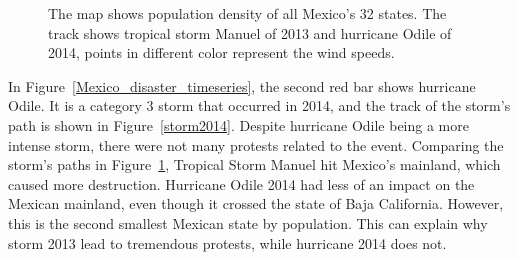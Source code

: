 \documentclass[9pt,twocolumn,twoside]{pnas-new}
\begin{document}
\begin{figure}[ht]
	\centering
	\caption{The map shows population density of all Mexico's 32 states. The track shows tropical storm Manuel of 2013 and hurricane Odile of 2014, points in different color represent the wind speeds. }
\label{Mexico-track-map}
\end{figure}



%

In Figure~\ref{Mexico_disaster_timeseries}, the second red bar shows hurricane Odile.
It is a category 3 storm that occurred in 2014, and the track of the storm's path is shown in Figure~\ref{storm2014}.
Despite hurricane Odile being a more intense storm, there were not many protests related to the event.
Comparing the storm's paths in Figure~\ref{Mexico-track-map}, Tropical Storm Manuel hit Mexico's mainland, which caused more destruction.
Hurricane Odile 2014 had less of an impact on the Mexican mainland, even though it crossed the state of Baja California. However, this is the second smallest Mexican state by population.
This can explain why storm 2013 lead to tremendous protests, while hurricane 2014 does not.
\end{document}

